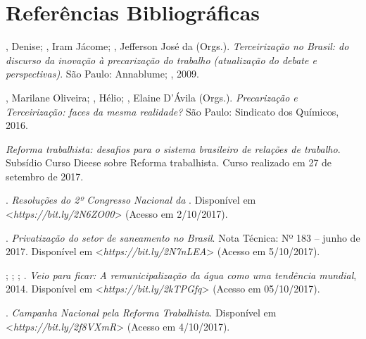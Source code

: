 
\section{Referências Bibliográficas}

\begin{Parskip}
, Denise; , Iram Jácome; ,
Jefferson José da (Orgs.). \emph{Terceirização no Brasil: do discurso da
inovação à precarização do trabalho (atualização do debate e perspectivas)}.
São Paulo: Annablume; , 2009.

, Marilane Oliveira; , Hélio;
, Elaine D'Ávila (Orgs.).
\emph{Precarização e Terceirização: faces da mesma realidade?} São
Paulo: Sindicato dos Químicos, 2016.

\emph{Reforma trabalhista: desafios para o sistema brasileiro de relações de
trabalho}. Subsídio Curso Dieese sobre Reforma trabalhista. Curso
realizado em 27 de setembro de 2017.

. \emph{Resoluções do 2º Congresso Nacional da }.
Disponível em \textless{}\emph{https://bit.ly/2N6ZO00}\textgreater{}
(Acesso em 2/10/2017).

. \emph{Privatização do setor de saneamento no Brasil}. Nota Técnica:
Nº 183 -- junho de 2017. Disponível em 
\textless{}\emph{https://bit.ly/2N7nLEA}\textgreater{}
(Acesso em 5/10/2017).

 ;   ; ;
  . \emph{Veio para ficar: A
  remunicipalização da água como uma tendência mundial}, 2014. Disponível em
\textless{}\emph{https://bit.ly/2kTPGfq}\textgreater{}
(Acesso em 05/10/2017).

 . \emph{Campanha Nacional pela Reforma Trabalhista}. Disponível em
\textless{}\emph{https://bit.ly/2f8VXmR}\textgreater{}
(Acesso em 4/10/2017).
\end{Parskip}